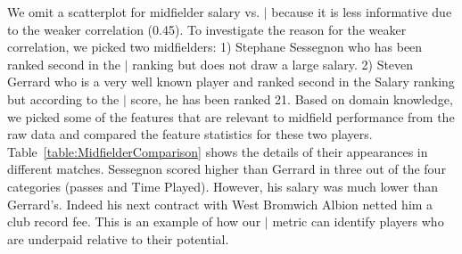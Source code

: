 {We omit a scatterplot for midfielder salary vs. $\mid$ because it is less informative due to the weaker  correlation (0.45).
%
To investigate the reason for the weaker correlation, we picked two midfielders: 1) Stephane Sessegnon  who has been ranked second in the $\mid$ ranking but does not draw a large salary. 2) Steven Gerrard who is a very well known player and ranked second in the Salary ranking but according to the $\mid$ score, he has been ranked 21. Based on domain knowledge, we picked some of the features that are relevant to midfield performance from the raw data and compared the feature statistics for these two players. Table~\ref{table:MidfielderComparison} shows the details of their appearances in different matches. Sessegnon scored higher than Gerrard in three out of the four categories (passes and Time Played). However, his salary was much lower than Gerrard's. Indeed his next contract with West Bromwich Albion netted him a club record fee. This is an example of how our $\mid$ metric can identify players who are underpaid relative to their potential.
		\begin{table}[htbp]
			
			\centering
\end{table}}
